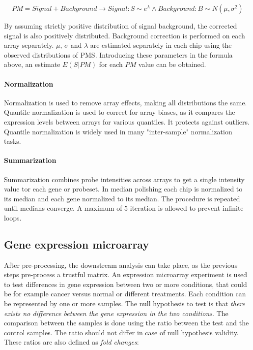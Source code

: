 			$$PM = Signal + Background \rightarrow Signal: S \sim e^\lambda \land Background : B\sim N(\mu, \sigma^2)$$


			By assuming strictly positive distribution of signal background, the corrected signal is also positively distributed.
			Background correction is performed on each array separately.
			$\mu$, $\sigma$ and $\lambda$ are estimated separately in each chip using the observed distributions of PMS.
			Introducing these parameters in the formula above, an estimate $E(S|PM)$ for each $PM$ value can be obtained.

			\paragraph{Normalization}
			Normalization is used to remove array effects, making all distributions the same.
			Quantile normalization is used to correct for array biases, as it compares the expression levels between arrays for various quantiles.
			It protects against outliers.
			Quantile normalization is widely used in many "inter-sample" normalization tasks.

			\paragraph{Summarization}
			Summarization combines probe intensities across arrays to get a single intensity value tor each gene or probeset.
			In median polishing each chip is normalized to its median and each gene normalized to its median.
			The procedure is repeated until medians converge.
			A maximum of $5$ iteration is allowed to prevent infinite loops.

	\subsection{Gene expression microarray}
	After pre-processing, the downstream analysis can take place, as the previous steps pre-process a trustful matrix.
	An expression microarray experiment is used to test differences in gene expression between two or more conditions, that could be for example cancer versus normal or different treatments.
	Each condition can be represented by one or more samples.
	The null hypothesis to test is that \textit{there exists no difference between the gene expression in the two conditions}.
	The comparison between the samples is done using the ratio between the test and the control samples.
	The ratio should not differ in case of null hypothesis validity.
	These ratios are also defined as \textit{fold changes}:


